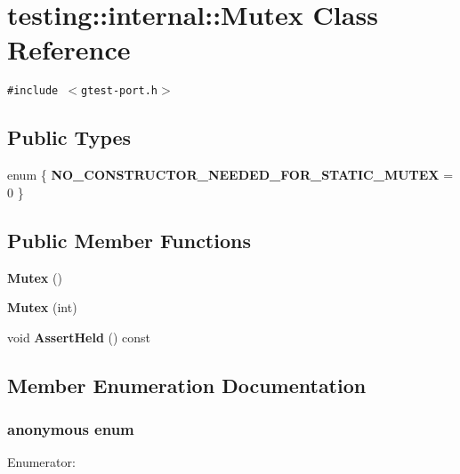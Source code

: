 \section{testing::internal::Mutex Class Reference}
\label{classtesting_1_1internal_1_1Mutex}
{\tt \#include $<$gtest-port.h$>$}

\subsection*{Public Types}
\begin{CompactItemize}
\item 
enum \{ {\bf NO\_\-CONSTRUCTOR\_\-NEEDED\_\-FOR\_\-STATIC\_\-MUTEX} =  0
 \}
\end{CompactItemize}
\subsection*{Public Member Functions}
\begin{CompactItemize}
\item 
{\bf Mutex} ()
\item 
{\bf Mutex} (int)
\item 
void {\bf AssertHeld} () const
\end{CompactItemize}


\subsection{Member Enumeration Documentation}
\subsubsection{\setlength{\rightskip}{0pt plus 5cm}anonymous enum}\label{classtesting_1_1internal_1_1Mutex_b750ba1374a7029d4042fef9092f1792}


\begin{Desc}
\item[Enumerator: ]\par
\begin{description}
\item[{\em 
NO\_\-CONSTRUCTOR\_\-NEEDED\_\-FOR\_\-STATIC\_\-MUTEX\label{classtesting_1_1internal_1_1Mutex_b750ba1374a7029d4042fef9092f17926599ff46df87f87d2f7c0236395ace12}
}]\end{description}
\end{Desc}



